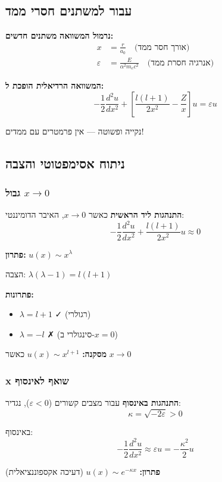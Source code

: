 \subsection{עבור למשתנים חסרי ממד}

\textbf{נרמול המשוואה}
\textbf{משתנים חדשים:}
\begin{align*}
x &= \frac{r}{a_0} \quad \text{(אורך חסר ממד)} \\
\varepsilon &= \frac{E}{\alpha^2 m_e c^2} \quad \text{(אנרגיה חסרת ממד)}
\end{align*}

\textbf{המשוואה הרדיאלית הופכת ל:}
\[
-\frac{1}{2}\frac{d^2u}{dx^2} + \left[\frac{l(l+1)}{2x^2} - \frac{Z}{x}\right]u = \varepsilon u
\]

נקייה ופשוטה — אין פרמטרים עם ממדים!

\subsection{ניתוח אסימפטוטי והצבה}

\subsubsection{גבול $x \to 0$}

\textbf{התנהגות ליד הראשית}
כאשר $x \to 0$, האיבר הדומיננטי:
\[
-\frac{1}{2}\frac{d^2u}{dx^2} + \frac{l(l+1)}{2x^2}u \approx 0
\]

\textbf{פתרון:} $u(x) \sim x^\lambda$

הצבה: $\lambda(\lambda-1) = l(l+1)$

\textbf{פתרונות:}
\begin{itemize}
    \item $\lambda = l+1$ ✓ (רגולרי)
    \item $\lambda = -l$ ✗ (סינגולרי ב-$x=0$)
\end{itemize}

\textbf{מסקנה:} $u(x) \sim x^{l+1}$ כאשר $x \to 0$


\subsubsection{x שואף לאינסוף}

\textbf{התנהגות באינסוף}
עבור מצבים קשורים ($\varepsilon < 0$), נגדיר:
\[
\kappa = \sqrt{-2\varepsilon} > 0
\]

באינסוף:
\[
-\frac{1}{2}\frac{d^2u}{dx^2} \approx \varepsilon u = -\frac{\kappa^2}{2}u
\]

\textbf{פתרון:} $u(x) \sim e^{-\kappa x}$ (דעיכה אקספוננציאלית)


